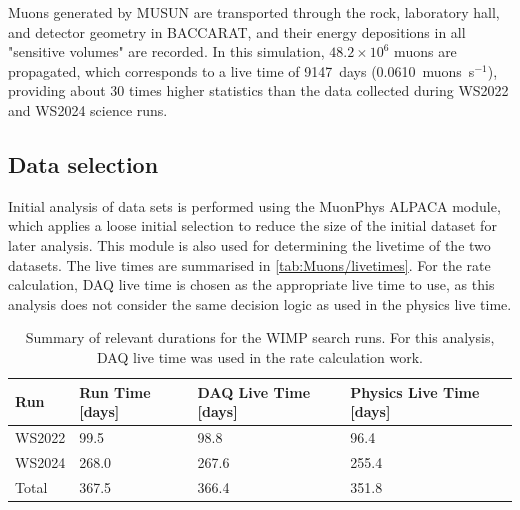 Muons generated by MUSUN are transported through the rock, laboratory hall, and detector geometry in BACCARAT, and their energy depositions in all "sensitive volumes" are recorded. In this simulation, $48.2\times10^6$ muons are propagated, which corresponds to a live time of 9147~days (0.0610~muons~s$^{-1}$), providing about 30 times higher statistics than the data collected during WS2022 and WS2024 science runs.

\subsection{Data selection}\label{sec:Muons/MuonFluxDataSelection}
Initial analysis of data sets is performed using the {\selectfont MuonPhys} ALPACA module, which applies a loose initial selection to reduce the size of the initial dataset for later analysis. This module is also used for determining the livetime of the two datasets. The live times are summarised in \autoref{tab:Muons/livetimes}. For the rate calculation, DAQ live time is chosen as the appropriate live time to use, as this analysis does not consider the same decision logic as used in the physics live time.
\begin{table}[h!]
    \centering
    \caption[Summary of relevant durations for the WIMP search runs.]{Summary of relevant durations for the WIMP search runs. For this analysis, DAQ live time was used in the rate calculation work.}
    \label{tab:Muons/livetimes}
    \begin{tabular}{llll}
        \hline\hline
        \textbf{Run} & \textbf{Run Time [days]} & \textbf{DAQ Live Time [days]} & \textbf{Physics Live Time [days]} \\
        \hline
        WS2022 & 99.5 & 98.8 & 96.4 \\
        WS2024 & 268.0 & 267.6 & 255.4 \\
        Total & 367.5 & 366.4 & 351.8 \\
        \hline\hline
    \end{tabular}
\end{table}
